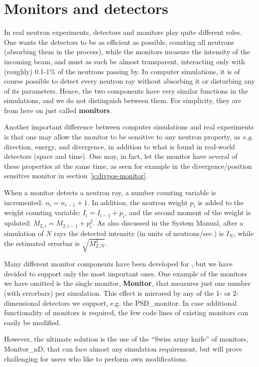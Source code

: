 \chapter{Monitors and detectors}

In real neutron experiments, detectors and monitors play quite
different roles. One wants the detectors to be as efficient as
possible, counting all neutrons (absorbing them in the process),
while the monitors measure the intensity of the incoming beam, and must
as such be almost transparent, interacting only with (roughly) 0.1-1\%
of the neutrons passing by. In computer simulations, it is
of course possible to detect every neutron ray without
absorbing it or disturbing any of its parameters. Hence, the two components
have very similar functions in the simulations, and we do
not distinguish between them. For simplicity, they are from here on
just called {\bf monitors}.

Another important difference between computer simulations
and real experiments is
that one may allow the monitor to be sensitive to any neutron property,
as {\em e.g.} direction, energy, and divergence, in addition to what
is found in real-world detectors (space and time). One may, in
fact, let the monitor have several of these properties at the same time,
as seen for example in the divergence/position sensitive monitor in
section~\ref{s:divpos-monitor}.

When a monitor detects a neutron ray,
a number counting variable is incremented: $n_i = n_{i-1}+1$.
In addition, the neutron
weight $p_i$ is added to the weight counting variable:
$I_i = I_{i-1} + p_i$,
and the second moment of the weight is
updated: $M_{2,i} = M_{2,i-1} + p_i^2$.
As also discussed in the System Manual, after a simulation of $N$ rays
the detected intensity (in units of neutrons/sec.) is $I_N$,
while the estimated errorbar is $\sqrt{M_{2,N}^2}$.

Many different monitor components have been developed for
\MCS , but we have decided to support only the most important ones.
One example of the monitors we have omitted is the single monitor,
{\bf Monitor},
that measures just one number (with errorbars) per simulation.
This effect is mirrored by any of the 1- or 2-dimensional detectors
we support, e.g. the {\rm PSD\_monitor}.
In case additional functionality of monitors is required,
the few code lines of existing monitors can easily be modified.

However, the ultimate solution is the use of the
``Swiss army knife'' of monitors, {\rm Monitor\_nD}, that can face
almost any simulation requirement, 
but will prove challenging for users who like to perform own modifications.

\newpage


\newpage


\newpage


\newpage


\newpage


\newpage


\newpage

